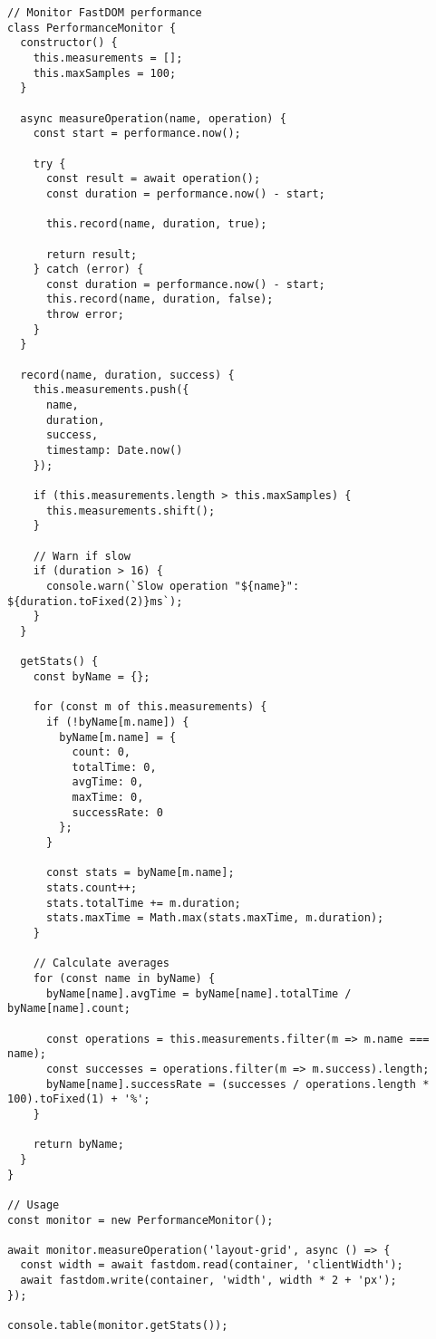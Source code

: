 \documentclass[11pt]{article}
\begin{document}
\begin{verbatim}
// Monitor FastDOM performance
class PerformanceMonitor {
  constructor() {
    this.measurements = [];
    this.maxSamples = 100;
  }
  
  async measureOperation(name, operation) {
    const start = performance.now();
    
    try {
      const result = await operation();
      const duration = performance.now() - start;
      
      this.record(name, duration, true);
      
      return result;
    } catch (error) {
      const duration = performance.now() - start;
      this.record(name, duration, false);
      throw error;
    }
  }
  
  record(name, duration, success) {
    this.measurements.push({
      name,
      duration,
      success,
      timestamp: Date.now()
    });
    
    if (this.measurements.length > this.maxSamples) {
      this.measurements.shift();
    }
    
    // Warn if slow
    if (duration > 16) {
      console.warn(`Slow operation "${name}": ${duration.toFixed(2)}ms`);
    }
  }
  
  getStats() {
    const byName = {};
    
    for (const m of this.measurements) {
      if (!byName[m.name]) {
        byName[m.name] = {
          count: 0,
          totalTime: 0,
          avgTime: 0,
          maxTime: 0,
          successRate: 0
        };
      }
      
      const stats = byName[m.name];
      stats.count++;
      stats.totalTime += m.duration;
      stats.maxTime = Math.max(stats.maxTime, m.duration);
    }
    
    // Calculate averages
    for (const name in byName) {
      byName[name].avgTime = byName[name].totalTime / byName[name].count;
      
      const operations = this.measurements.filter(m => m.name === name);
      const successes = operations.filter(m => m.success).length;
      byName[name].successRate = (successes / operations.length * 100).toFixed(1) + '%';
    }
    
    return byName;
  }
}

// Usage
const monitor = new PerformanceMonitor();

await monitor.measureOperation('layout-grid', async () => {
  const width = await fastdom.read(container, 'clientWidth');
  await fastdom.write(container, 'width', width * 2 + 'px');
});

console.table(monitor.getStats());
\end{verbatim}
\end{document}

